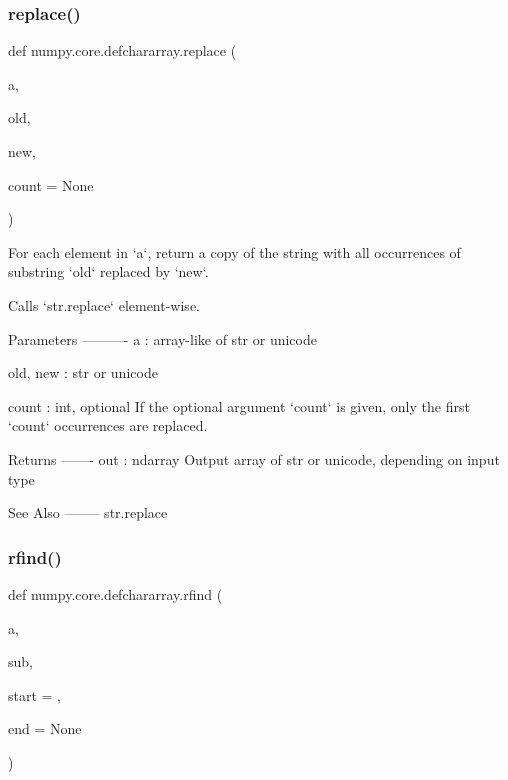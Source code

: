 \subsubsection{\texorpdfstring{replace()}{replace()}}
{\footnotesize\ttfamily def numpy.\+core.\+defchararray.\+replace (\begin{DoxyParamCaption}\item[{}]{a,  }\item[{}]{old,  }\item[{}]{new,  }\item[{}]{count = {\ttfamily None} }\end{DoxyParamCaption})}

\begin{DoxyVerb}For each element in `a`, return a copy of the string with all
occurrences of substring `old` replaced by `new`.

Calls `str.replace` element-wise.

Parameters
----------
a : array-like of str or unicode

old, new : str or unicode

count : int, optional
    If the optional argument `count` is given, only the first
    `count` occurrences are replaced.

Returns
-------
out : ndarray
    Output array of str or unicode, depending on input type

See Also
--------
str.replace\end{DoxyVerb}
 \mbox{\label{namespacenumpy_1_1core_1_1defchararray_ac13bd790bc70787c8d77bec668ac20ba}} 
\subsubsection{\texorpdfstring{rfind()}{rfind()}}
{\footnotesize\ttfamily def numpy.\+core.\+defchararray.\+rfind (\begin{DoxyParamCaption}\item[{}]{a,  }\item[{}]{sub,  }\item[{}]{start = {},  }\item[{}]{end = {\ttfamily None} }\end{DoxyParamCaption})}


